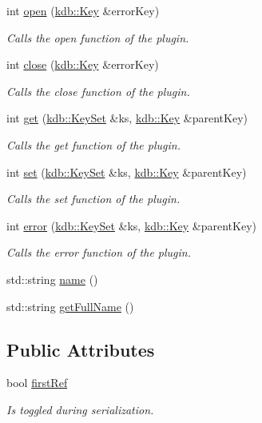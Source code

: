 \begin{DoxyCompactItemize}
int \hyperlink{classkdb_1_1tools_1_1Plugin_a680a490123b5290441d76ef2c1e3f1fa}{open} (\hyperlink{classkdb_1_1Key}{kdb\+::\+Key} \&error\+Key)
\begin{DoxyCompactList}\small\item\em Calls the open function of the plugin. \end{DoxyCompactList}\item 
int \hyperlink{classkdb_1_1tools_1_1Plugin_a40b5fd413f3f6da735680ed8d7c8a6a2}{close} (\hyperlink{classkdb_1_1Key}{kdb\+::\+Key} \&error\+Key)
\begin{DoxyCompactList}\small\item\em Calls the close function of the plugin. \end{DoxyCompactList}\item 
int \hyperlink{classkdb_1_1tools_1_1Plugin_a2aa6ff55f9cf81a59d2a8d271fe68e0f}{get} (\hyperlink{classkdb_1_1KeySet}{kdb\+::\+Key\+Set} \&ks, \hyperlink{classkdb_1_1Key}{kdb\+::\+Key} \&parent\+Key)
\begin{DoxyCompactList}\small\item\em Calls the get function of the plugin. \end{DoxyCompactList}\item 
int \hyperlink{classkdb_1_1tools_1_1Plugin_abf84d512b48f6fa1b89636217537cde0}{set} (\hyperlink{classkdb_1_1KeySet}{kdb\+::\+Key\+Set} \&ks, \hyperlink{classkdb_1_1Key}{kdb\+::\+Key} \&parent\+Key)
\begin{DoxyCompactList}\small\item\em Calls the set function of the plugin. \end{DoxyCompactList}\item 
int \hyperlink{classkdb_1_1tools_1_1Plugin_a8ec348b49a34ef17fda64cb289b8cf64}{error} (\hyperlink{classkdb_1_1KeySet}{kdb\+::\+Key\+Set} \&ks, \hyperlink{classkdb_1_1Key}{kdb\+::\+Key} \&parent\+Key)
\begin{DoxyCompactList}\small\item\em Calls the error function of the plugin. \end{DoxyCompactList}\item 
std\+::string \hyperlink{classkdb_1_1tools_1_1Plugin_ae4b82f943d0cdb0dd355924aa3201d6f}{name} ()
\item 
std\+::string \hyperlink{classkdb_1_1tools_1_1Plugin_acbe982e7bbb71aafb49b0d632e8650c9}{get\+Full\+Name} ()
\end{DoxyCompactItemize}
\subsection*{Public Attributes}
\begin{DoxyCompactItemize}
\item 
bool \hyperlink{classkdb_1_1tools_1_1Plugin_aee8ae2b5708c74d4ccdc1bf9e8794636}{first\+Ref}
\begin{DoxyCompactList}\small\item\em Is toggled during serialization. \end{DoxyCompactList}\end{DoxyCompactItemize}


